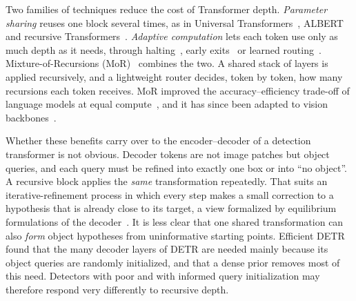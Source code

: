 \documentclass[pdflatex,iicol,sn-basic,Numbered]{sn-jnl}
\begin{document}
Two families of techniques reduce the cost of Transformer depth. \emph{Parameter sharing} reuses one block several times, as in Universal Transformers~\cite{dehghani2019universal}, ALBERT~\cite{lan2020albert} and recursive Transformers~\cite{bae2025relaxed}. \emph{Adaptive computation} lets each token use only as much depth as it needs, through halting~\cite{graves2016act,banino2021pondernet}, early exits~\cite{teerapittayanon2016branchynet} or learned routing~\cite{raposo2024mod,zhou2022expertchoice}. Mixture-of-Recursions (MoR)~\cite{bae2025mor} combines the two. A shared stack of layers is applied recursively, and a lightweight router decides, token by token, how many recursions each token receives. MoR improved the accuracy--efficiency trade-off of language models at equal compute~\cite{bae2025mor}, and it has since been adapted to vision backbones~\cite{visionmor2026,morswin2026,morst2026,edgerecvit2026,softmor2026}.

Whether these benefits carry over to the encoder--decoder of a detection transformer is not obvious. Decoder tokens are not image patches but object queries, and each query must be refined into exactly one box or into ``no object''. A recursive block applies the \emph{same} transformation repeatedly. That suits an iterative-refinement process in which every step makes a small correction to a hypothesis that is already close to its target, a view formalized by equilibrium formulations of the decoder~\cite{bai2019deq,wang2023deqdet}. It is less clear that one shared transformation can also \emph{form} object hypotheses from uninformative starting points. Efficient DETR~\cite{yao2021efficient} found that the many decoder layers of DETR are needed mainly because its object queries are randomly initialized, and that a dense prior removes most of this need. Detectors with poor and with informed query initialization may therefore respond very differently to recursive depth.
\end{document}
